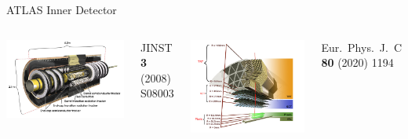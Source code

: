 \documentclass[11pt, xcolor={dvipsnames}, aspectratio=169, notes]{beamer}
\begin{document}

\begin{frame}{ATLAS Inner Detector}
  \begin{columns}
    \centering\footnotesize

    \includegraphics[width=\textwidth]{atlas/atlas_indet_1}

    JINST \textbf{3} (2008) S08003

    \centering\footnotesize

    \includegraphics[width=\textwidth]{atlas/atlas_indet_2_with_ibl}

    Eur.\ Phys.\ J.\ C \textbf{80} (2020) 1194
  \end{columns}
\end{frame}
\end{document}
